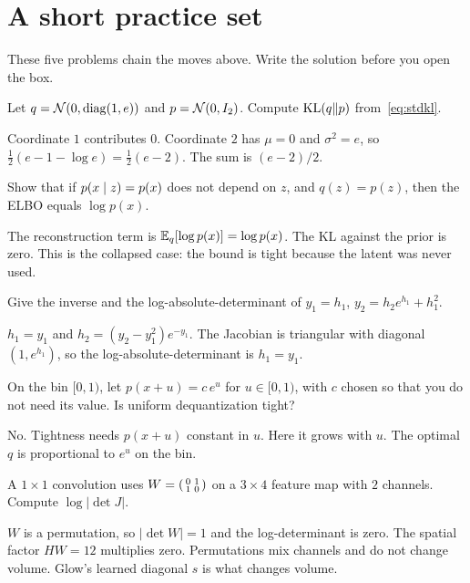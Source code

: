 \chapter{A short practice set}
\label{ch:set}

These five problems chain the moves above. Write the solution before you open the box.

\begin{practbox}
Let $q=\mathcal{N}(0,\operatorname{diag}(1,e))$ and $p=\mathcal{N}(0,I_2)$. Compute $\mathrm{KL}(q\Vert p)$ from~\eqref{eq:stdkl}.
\end{practbox}
\begin{solbox}
Coordinate $1$ contributes $0$. Coordinate $2$ has $\mu=0$ and $\sigma^2=e$, so $\tfrac12(e-1-\log e)=\tfrac12(e-2)$. The sum is $(e-2)/2$.
\end{solbox}

\begin{practbox}
Show that if $p(x\mid z)=p(x)$ does not depend on $z$, and $q(z)=p(z)$, then the ELBO equals $\log p(x)$.
\end{practbox}
\begin{solbox}
The reconstruction term is $\mathbb{E}_q[\log p(x)]=\log p(x)$. The KL against the prior is zero. This is the collapsed case: the bound is tight because the latent was never used.
\end{solbox}

\begin{practbox}
Give the inverse and the log-absolute-determinant of $y_1=h_1$, $y_2=h_2 e^{h_1}+h_1^2$.
\end{practbox}
\begin{solbox}
$h_1=y_1$ and $h_2=(y_2-y_1^2)e^{-y_1}$. The Jacobian is triangular with diagonal $(1, e^{h_1})$, so the log-absolute-determinant is $h_1=y_1$.
\end{solbox}

\begin{practbox}
On the bin $[0,1)$, let $p(x+u)=c\,e^{u}$ for $u\in[0,1)$, with $c$ chosen so that you do not need its value. Is uniform dequantization tight?
\end{practbox}
\begin{solbox}
No. Tightness needs $p(x+u)$ constant in $u$. Here it grows with $u$. The optimal $q$ is proportional to $e^{u}$ on the bin.
\end{solbox}

\begin{practbox}
A $1\times 1$ convolution uses $W=\begin{psmallmatrix}0&1\\1&0\end{psmallmatrix}$ on a $3\times 4$ feature map with $2$ channels. Compute $\log\lvert\det J\rvert$.
\end{practbox}
\begin{solbox}
$W$ is a permutation, so $\lvert\det W\rvert=1$ and the log-determinant is zero. The spatial factor $HW=12$ multiplies zero. Permutations mix channels and do not change volume. Glow's learned diagonal $s$ is what changes volume.
\end{solbox}
